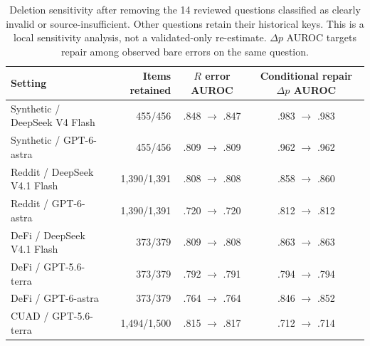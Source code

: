 \begin{table}[h]\centering\footnotesize
\caption{Deletion sensitivity after removing the 14 reviewed questions classified as clearly invalid or source-insufficient. Other questions retain their historical keys. This is a local sensitivity analysis, not a validated-only re-estimate. $\Delta p$ AUROC targets repair among observed bare errors on the same question.}
\label{tab:validity-sensitivity}
\begin{tabular}{@{}p{4.0cm}rcc@{}}\toprule
Setting & Items retained & $R$ error AUROC & Conditional repair $\Delta p$ AUROC\\\midrule
Synthetic / DeepSeek V4 Flash & 455/456 & .848 $\to$ .847 & .983 $\to$ .983\\
Synthetic / GPT-6-astra & 455/456 & .809 $\to$ .809 & .962 $\to$ .962\\
Reddit / DeepSeek V4.1 Flash & 1,390/1,391 & .808 $\to$ .808 & .858 $\to$ .860\\
Reddit / GPT-6-astra & 1,390/1,391 & .720 $\to$ .720 & .812 $\to$ .812\\
DeFi / DeepSeek V4.1 Flash & 373/379 & .809 $\to$ .808 & .863 $\to$ .863\\
DeFi / GPT-5.6-terra & 373/379 & .792 $\to$ .791 & .794 $\to$ .794\\
DeFi / GPT-6-astra & 373/379 & .764 $\to$ .764 & .846 $\to$ .852\\
CUAD / GPT-5.6-terra & 1,494/1,500 & .815 $\to$ .817 & .712 $\to$ .714\\\bottomrule
\end{tabular}
\end{table}
